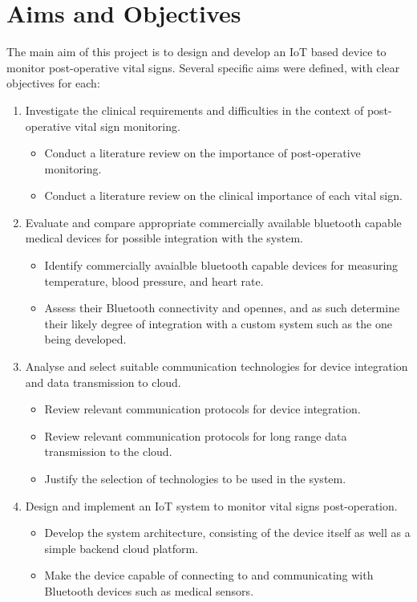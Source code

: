 \section{Aims and Objectives} %
The main aim of this project is to design and develop an IoT based device to monitor post-operative vital signs. Several specific aims were defined, with clear objectives for each:
\begin{enumerate}
	\item Investigate the clinical requirements and difficulties in the context of post-operative vital sign monitoring.
	\begin{itemize}
		\item Conduct a literature review on the importance of post-operative monitoring.
		\item Conduct a literature review on the clinical importance of each vital sign.
	\end{itemize}
	\item Evaluate and compare appropriate commercially available bluetooth capable medical devices for possible integration with the system.
	\begin{itemize}
		\item Identify commercially avaialble bluetooth capable devices for measuring temperature, blood pressure, and heart rate.
		\item Assess their Bluetooth connectivity and opennes, and as such determine their likely degree of integration with a custom system such as the one being developed.
	\end{itemize}
	\item Analyse and select suitable communication technologies for device integration and data transmission to cloud.
	\begin{itemize}
		\item Review relevant communication protocols for device integration.
		\item Review relevant communication protocols for long range data transmission to the cloud.
		\item Justify the selection of technologies to be used in the system.
	\end{itemize}
	\item Design and implement an IoT system to monitor vital signs post-operation.
	\begin{itemize}
		\item Develop the system architecture, consisting of the device itself as well as a simple backend cloud platform.
		\item Make the device capable of connecting to and communicating with Bluetooth devices such as medical sensors.

\end{itemize}
\end{enumerate}
